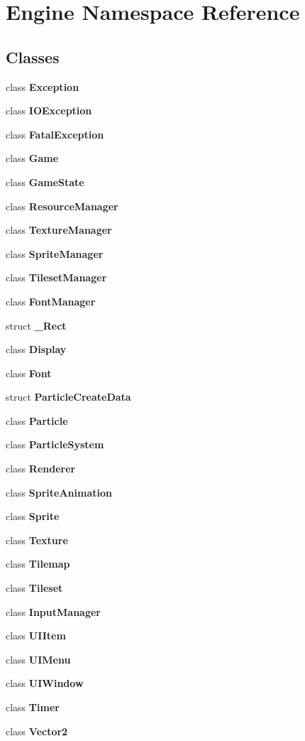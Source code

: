\section{Engine Namespace Reference}
\label{namespaceEngine}


\subsection*{Classes}
\begin{CompactItemize}
\item 
class {\bf Exception}
\item 
class {\bf IOException}
\item 
class {\bf FatalException}
\item 
class {\bf Game}
\item 
class {\bf GameState}
\item 
class \textbf{ResourceManager}
\item 
class \textbf{TextureManager}
\item 
class \textbf{SpriteManager}
\item 
class \textbf{TilesetManager}
\item 
class \textbf{FontManager}
\item 
struct \textbf{\_\-Rect}
\item 
class \textbf{Display}
\item 
class \textbf{Font}
\item 
struct \textbf{ParticleCreateData}
\item 
class \textbf{Particle}
\item 
class \textbf{ParticleSystem}
\item 
class {\bf Renderer}
\item 
class \textbf{SpriteAnimation}
\item 
class \textbf{Sprite}
\item 
class \textbf{Texture}
\item 
class \textbf{Tilemap}
\item 
class \textbf{Tileset}
\item 
class \textbf{InputManager}
\item 
class \textbf{UIItem}
\item 
class \textbf{UIMenu}
\item 
class \textbf{UIWindow}
\item 
class {\bf Timer}
\item 
class {\bf Vector2}
\end{CompactItemize}
